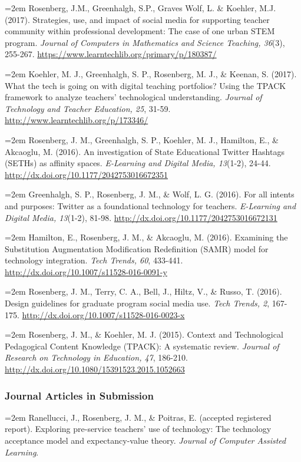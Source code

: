 \documentclass[]{article}
\begin{document}
\hangindent=2em Rosenberg, J.M., Greenhalgh, S.P., Graves Wolf, L. \&
Koehler, M.J. (2017). Strategies, use, and impact of social media for
supporting teacher community within professional development: The case
of one urban STEM program. \emph{Journal of Computers in Mathematics and
Science Teaching, 36}(3), 255-267.
\url{https://www.learntechlib.org/primary/p/180387/}

\hangindent=2em Koehler, M. J., Greenhalgh, S. P., Rosenberg, M. J., \&
Keenan, S. (2017). What the tech is going on with digital teaching
portfolios? Using the TPACK framework to analyze teachers' technological
understanding. \emph{Journal of Technology and Teacher Education, 25},
31-59. \url{http://www.learntechlib.org/p/173346/}

\hangindent=2em Rosenberg, J. M., Greenhalgh, S. P., Koehler, M. J.,
Hamilton, E., \& Akcaoglu, M. (2016). An investigation of State
Educational Twitter Hashtags (SETHs) as affinity spaces.
\emph{E-Learning and Digital Media, 13}(1-2), 24-44.
\url{http://dx.doi.org/10.1177/2042753016672351}

\hangindent=2em Greenhalgh, S. P., Rosenberg, J. M., \& Wolf, L. G.
(2016). For all intents and purposes: Twitter as a foundational
technology for teachers. \emph{E-Learning and Digital Media, 13}(1-2),
81-98. \url{http://dx.doi.org/10.1177/2042753016672131}

\hangindent=2em Hamilton, E., Rosenberg, J. M., \& Akcaoglu, M. (2016).
Examining the Substitution Augmentation Modification Redefinition (SAMR)
model for technology integration. \emph{Tech Trends, 60}, 433-441.
\url{http://dx.doi.org/10.1007/s11528-016-0091-y}

\hangindent=2em Rosenberg, J. M., Terry, C. A., Bell, J., Hiltz, V., \&
Russo, T. (2016). Design guidelines for graduate program social media
use. \emph{Tech Trends, 2}, 167-175.
\url{http://dx.doi.org/10.1007/s11528-016-0023-x}

\hangindent=2em Rosenberg, J. M., \& Koehler, M. J. (2015). Context and
Technological Pedagogical Content Knowledge (TPACK): A systematic
review. \emph{Journal of Research on Technology in Education, 47},
186-210. \url{http://dx.doi.org/10.1080/15391523.2015.1052663}

\subsubsection{Journal Articles in
Submission}\label{journal-articles-in-submission}

\hangindent=2em Ranellucci, J., Rosenberg, J. M., \& Poitras, E.
(accepted registered report). Exploring pre-service teachers' use of
technology: The technology acceptance model and expectancy-value theory.
\emph{Journal of Computer Assisted Learning}.
\end{document}
